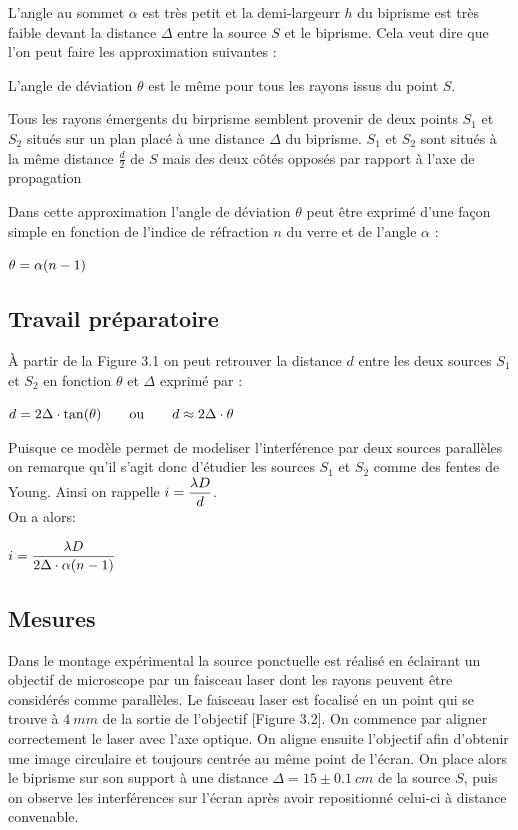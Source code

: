 \documentclass[11pt, openright]{book}
\begin{document}
			
			L'angle au sommet $\alpha $ est très petit et la demi-largeurr $h$ du biprisme est très faible devant la distance $\Delta $ entre la source $S$ et le biprisme. Cela veut dire que l'on peut faire les approximation suivantes : 
			\begin{items}{-15pt}{-15pt}
				\item L'angle de déviation $\theta$ est le même pour tous les rayons issus du point $S$.
				\item Tous les rayons émergents du birprisme semblent provenir de deux points $S_1$ et $S_2$ situés sur un plan placé à une distance $\Delta $ du biprisme. $S_1$ et $S_2$ sont situés à la même distance $\frac{d}{2}$ de $S$ mais des deux côtés opposés par rapport à l'axe de propagation
			\end{items}

			Dans cette approximation l'angle de déviation $\theta$ peut être exprimé d'une façon simple en fonction de l'indice de réfraction $n$ du verre et de l'angle $\alpha $ : \\
			\centerline{$\displaystyle{\theta=\alpha (n-1)}$}


			\subsection{Travail préparatoire}

			À partir de la Figure 3.1 on peut retrouver la distance $d$ entre les deux sources $S_1$ et $S_2$ en fonction $\theta$ et $\Delta$ exprimé par : \\
			\centerline{$\displaystyle{d=2\Delta \cdot  \tan(\theta)}\qquad\text{ou}\qquad\displaystyle{d\approx2\Delta\cdot \theta }$}
 
			Puisque ce modèle permet de modeliser l'interférence par deux sources parallèles on remarque qu'il s'agit donc d'étudier les sources $S_1$ et $S_2$ comme des fentes de Young. Ainsi on rappelle $\displaystyle{i=\frac{\lambda D}{d}}$.\\
			On a alors: \\
			\centerline{$\displaystyle{i=\frac{\lambda D}{2\Delta \cdot  \alpha (n-1)}}$}
			
			\subsection{Mesures}

			Dans le montage expérimental la source ponctuelle est réalisé en éclairant un objectif de microscope par un faisceau laser dont les rayons peuvent être considérés comme parallèles. Le faisceau laser est focalisé en un point qui se trouve à $4\ mm$ de la sortie de l'objectif [Figure 3.2]. On commence par aligner correctement le laser avec l'axe optique. On aligne ensuite l'objectif afin d'obtenir une image circulaire et toujours centrée au même point de l'écran. On place alors le biprisme sur son support à une distance $\Delta =15\pm 0.1\ cm$ de la source $S$, puis on observe les interférences sur l'écran après avoir repositionné celui-ci à distance convenable.
\end{document}
